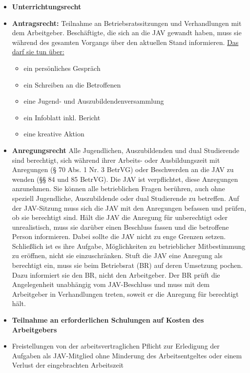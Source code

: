 \begin{itemize}
	\item
	\textbf{Unterrichtungsrecht}
	\item 
	\textbf{Antragsrecht:}
	\newline 
	{
	Teilnahme an Betriebsratssitzungen und Verhandlungen mit dem Arbeitgeber. 
	\newline
		Beschäftigte, die sich an die JAV gewandt haben, muss sie während des gesamten Vorgangs über den aktuellen Stand informieren. \newline 
		\underline{Das darf sie tun über:}
	}
	\begin{itemize}
		\item 
		ein persönliches Gespräch
		\item
		ein Schreiben an die Betroffenen
		\item
		eine Jugend- und Auszubildendenversammlung 
		\item
		ein Infoblatt inkl. Bericht
		\item
		eine kreative Aktion
	\end{itemize}
	\item 
	\textbf{Anregungsrecht}
	\newline 
	{
		Alle Jugendlichen, Auszubildenden und dual Studierende sind berechtigt, sich während ihrer Arbeits- oder Ausbildungszeit mit Anregungen (§ 70 Abs. 1 Nr. 3 BetrVG) oder Beschwerden an die JAV zu wenden (§§ 84 und 85 BetrVG).
		\newline
		Die JAV ist verpflichtet, diese Anregungen anzunehmen. Sie können alle betrieblichen Fragen berühren, auch ohne speziell Jugendliche, Auszubildende oder dual Studierende zu betreffen. Auf der JAV-Sitzung muss sich die JAV mit den Anregungen befassen und prüfen, ob sie berechtigt sind.
		\newline
		Hält die JAV die Anregung für unberechtigt oder unrealistisch, muss sie darüber einen Beschluss fassen und die betroffene Person informieren. Dabei sollte die JAV nicht zu enge Grenzen setzen. Schließlich ist es ihre Aufgabe, Möglichkeiten zu betrieblicher Mitbestimmung zu eröffnen, nicht sie einzuschränken.
		\newline
		Stuft die JAV eine Anregung als berechtigt ein, muss sie beim Betriebsrat (BR) auf deren Umsetzung pochen. Dazu informiert sie den BR, nicht den Arbeitgeber. Der BR prüft die Angelegenheit unabhängig vom JAV-Beschluss und muss mit dem Arbeitgeber in Verhandlungen treten, soweit er die Anregung für berechtigt hält.
	}
	\item
	\textbf{Teilnahme an erforderlichen Schulungen auf Kosten des Arbeitgebers}
	\item
	Freistellungen von der arbeitsvertraglichen Pflicht zur Erledigung der Aufgaben als JAV-Mitglied ohne Minderung des Arbeitsentgeltes oder einem Verlust der eingebrachten Arbeitszeit
\end{itemize}
